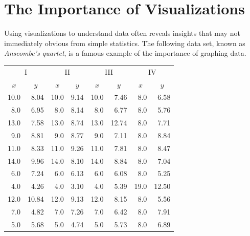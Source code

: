 \label{lab:DataVis}

\section*{The Importance of Visualizations} %

Using visualizations to understand data often reveals insights that may not immediately obvious from simple statistics.
The following data set, known as \emph{Anscombe's quartet}, is a famous example of the importance of graphing data.

\begin{table}[H]
\small{
\begin{tabular}{rr|rr|rr|rr}

\multicolumn{2}{c|}{I}    & \multicolumn{2}{|c|}{II} &
\multicolumn{2}{|c|}{III} & \multicolumn{2}{|c}{IV} \\
\multicolumn{1}{c}{$x$}   & \multicolumn{1}{c|}{$y$} &
\multicolumn{1}{|c}{$x$}  & \multicolumn{1}{c|}{$y$} &
\multicolumn{1}{|c}{$x$}  & \multicolumn{1}{c|}{$y$} &
\multicolumn{1}{|c}{$x$}  & \multicolumn{1}{c}{$y$} \\
\hline
10.0 & 8.04  & 10.0 & 9.14 & 10.0 & 7.46  & 8.0  & 6.58  \\
8.0  & 6.95  & 8.0  & 8.14 & 8.0  & 6.77  & 8.0  & 5.76  \\
13.0 & 7.58  & 13.0 & 8.74 & 13.0 & 12.74 & 8.0  & 7.71  \\
9.0  & 8.81  & 9.0  & 8.77 & 9.0  & 7.11  & 8.0  & 8.84  \\
11.0 & 8.33  & 11.0 & 9.26 & 11.0 & 7.81  & 8.0  & 8.47  \\
14.0 & 9.96  & 14.0 & 8.10 & 14.0 & 8.84  & 8.0  & 7.04  \\
6.0  & 7.24  & 6.0  & 6.13 & 6.0  & 6.08  & 8.0  & 5.25  \\
4.0  & 4.26  & 4.0  & 3.10 & 4.0  & 5.39  & 19.0 & 12.50 \\
12.0 & 10.84 & 12.0 & 9.13 & 12.0 & 8.15  & 8.0  & 5.56  \\
7.0  & 4.82  & 7.0  & 7.26 & 7.0  & 6.42  & 8.0  & 7.91  \\
5.0  & 5.68  & 5.0  & 4.74 & 5.0  & 5.73  & 8.0  & 6.89  \\
\end{tabular}}
\end{table}

